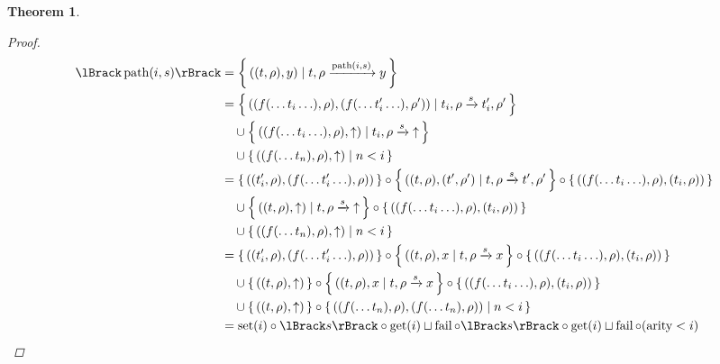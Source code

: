 \documentclass{article}
\newtheorem{theorem}{Theorem}
\newcommand{\fail}{\ensuremath \text{$\uparrow$}}
\newcommand{\path}[2]{\ensuremath \operatorname{path}(#1,#2)}
\newcommand{\transform}[5]{#1, #2 \xrightarrow{#3} #4, #5}
\newcommand{\transformx}[4]{#1, #2 \xrightarrow{#3} #4}
\newcommand{\transformfail}[3]{#1, #2 \xrightarrow{#3} \fail}
\newcommand{\sem}[1]{\ensuremath \lBrack #1 \rBrack}
\newcommand{\setbuild}[2]{\ensuremath \left\{\, #1 \mid #2 \,\right\}}
\newcommand{\setbuildc}[1]{\ensuremath \left\{\, #1 \,\right\}}
\newcommand{\lfail}{\ensuremath \operatorname{fail}}
\newcommand{\set}{\ensuremath \operatorname{set}}
\newcommand{\get}{\ensuremath \operatorname{get}}
\newcommand{\arity}{\ensuremath \operatorname{arity}}
\begin{document}
\begin{theorem}
\begin{proof}
\begin{align*}
  \sem{\path{i}{s}}
    &= {\setbuild{((t,\rho),y)}{\transformx{t}{\rho}{\path{i}{s}}{y}}} \\
    &= {\setbuild{((f(\ldots t_i \ldots),\rho),(f(\ldots t_i' \ldots),\rho'))}{\transform{t_i}{\rho}{s}{t_i'}{\rho'}}} \\
    &\quad \cup {\setbuild{((f(\ldots t_i \ldots),\rho),\fail)}{\transformfail{t_i}{\rho}{s}}} \\
    &\quad \cup {\setbuild{((f(\ldots t_n),\rho),\fail)}{ n < i }} \\
    &= {\setbuildc{((t_i',\rho),(f(\ldots t_i' \ldots),\rho))}} \circ {\setbuild{((t,\rho),(t',\rho')}{\transform{t}{\rho}{s}{t'}{\rho'}}} \circ {\setbuildc{((f(\ldots t_i \ldots),\rho),(t_i,\rho))}} \\
    &\quad \cup {\setbuild{((t,\rho),\fail)}{\transformfail{t}{\rho}{s}}} \circ {\setbuildc{((f(\ldots t_i \ldots),\rho),(t_i,\rho))}} \\
    &\quad \cup {\setbuild{((f(\ldots t_n),\rho),\fail)}{ n < i }} \\
    &= {\setbuildc{((t_i',\rho),(f(\ldots t_i' \ldots),\rho))}} \circ {\setbuild{((t,\rho),x}{\transformx{t}{\rho}{s}{x}}} \circ {\setbuildc{((f(\ldots t_i \ldots),\rho),(t_i,\rho))}} \\
    &\quad \cup {\setbuildc{((t,\rho),\fail)}} \circ {\setbuild{((t,\rho),x}{\transformx{t}{\rho}{s}{x}}} \circ {\setbuildc{((f(\ldots t_i \ldots),\rho),(t_i,\rho))}} \\
    &\quad \cup {\setbuildc{((t,\rho),\fail)}} \circ {\setbuild{((f(\ldots t_n),\rho),(f(\ldots t_n),\rho))}{ n < i }} \\
    &= \set(i) \circ \sem{s} \circ \get(i) \sqcup \lfail \circ \sem{s} \circ \get(i) \sqcup \lfail \circ {(\arity < i)}  
\end{align*}


\end{proof}
\end{theorem}
\end{document}
